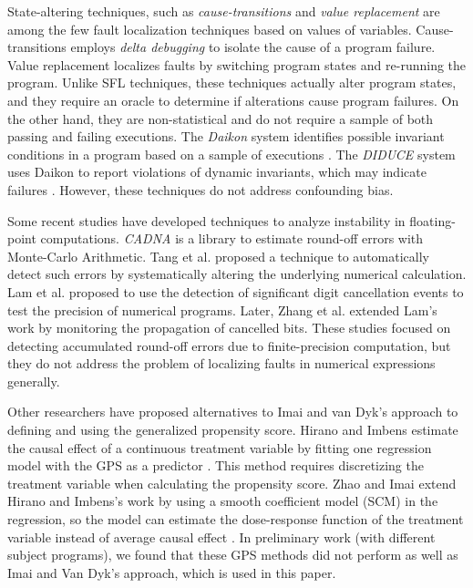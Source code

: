 State-altering techniques, such as {\it cause-transitions} \cite{Cleve2005} and {\it value replacement} \cite{Jeffrey2008} are among the few fault localization techniques based on values of variables.  Cause-transitions employs {\it delta debugging} \cite{Zeller2002} to isolate the cause of a program failure. Value replacement localizes faults by switching program states and re-running the program. Unlike SFL techniques, these techniques actually alter program states, and they require an oracle to determine if alterations cause program failures. On the other hand, they are non-statistical and do not require a sample of both passing and failing executions. The {\it Daikon} system identifies possible invariant conditions in a program based on a sample of executions \cite{Ernst2007}. The {\it DIDUCE} system uses Daikon to report violations of dynamic invariants, which may indicate failures \cite{Hangal2002}. However, these techniques do not address confounding bias.


Some recent studies have developed techniques to analyze instability in floating-point computations. {\it CADNA} \cite{Scott2007} is a library to estimate round-off errors with Monte-Carlo Arithmetic. Tang et al. \cite{Tang2010} proposed a technique to automatically detect such errors by systematically altering the underlying numerical calculation. Lam et al. \cite{Lam2013} proposed to use the detection of significant digit cancellation events to test the precision of numerical programs.  Later, Zhang et al. \cite{Bao2013} extended Lam's work by monitoring the propagation of cancelled bits.  These studies focused on detecting accumulated round-off errors due to finite-precision computation, but they do not address the problem of localizing faults in numerical expressions generally.


Other researchers have proposed alternatives to Imai and van Dyk's approach to defining and using the generalized propensity score.  Hirano and Imbens estimate the causal effect of a continuous treatment variable by fitting one regression model with the GPS as a predictor \cite{Hirano2004}. This method requires discretizing the treatment variable when calculating the propensity score.  Zhao and Imai extend Hirano and Imbens's work by using a smooth coefficient model (SCM) in the regression, so the model can estimate the dose-response function of the treatment variable instead of average causal effect \cite{Zhao2013}.  In preliminary work (with different subject programs), we found that these GPS methods did not perform as well as Imai and Van Dyk's approach, which is used in this paper.


